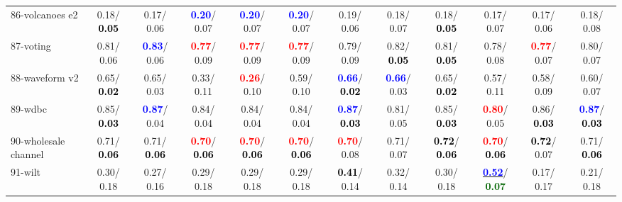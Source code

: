 \begin{table}[h]
\begin{center}
{\begin{tabular}{lc|c|c|c|c|c|c|c|c|c|c}
86-volcanoes e2 &   0.18/\textcolor{black}{\textbf{  0.05}} &   0.17/  0.06 & \textcolor{blue}{\textbf{  0.20}}/  0.07 & \textcolor{blue}{\textbf{  0.20}}/  0.07 & \textcolor{blue}{\textbf{  0.20}}/  0.07 &   0.19/  0.06 &   0.18/  0.07 &   0.18/\textcolor{black}{\textbf{  0.05}} &   0.17/  0.07 &   0.17/  0.06 &   0.18/  0.08 \\
87-voting &   0.81/  0.06 & \textcolor{blue}{\textbf{  0.83}}/  0.06 & \textcolor{red}{\textbf{  0.77}}/  0.09 & \textcolor{red}{\textbf{  0.77}}/  0.09 & \textcolor{red}{\textbf{  0.77}}/  0.09 &   0.79/  0.09 &   0.82/\textcolor{black}{\textbf{  0.05}} &   0.81/\textcolor{black}{\textbf{  0.05}} &   0.78/  0.08 & \textcolor{red}{\textbf{  0.77}}/  0.07 &   0.80/  0.07 \\
88-waveform v2 &   0.65/\textcolor{black}{\textbf{  0.02}} &   0.65/  0.03 &   0.33/  0.11 & \textcolor{red}{\textbf{  0.26}}/  0.10 &   0.59/  0.10 & \textcolor{blue}{\textbf{  0.66}}/\textcolor{black}{\textbf{  0.02}} & \textcolor{blue}{\textbf{  0.66}}/  0.03 &   0.65/\textcolor{black}{\textbf{  0.02}} &   0.57/  0.11 &   0.58/  0.09 &   0.60/  0.07 \\
89-wdbc &   0.85/\textcolor{black}{\textbf{  0.03}} & \textcolor{blue}{\textbf{  0.87}}/  0.04 &   0.84/  0.04 &   0.84/  0.04 &   0.84/  0.04 & \textcolor{blue}{\textbf{  0.87}}/\textcolor{black}{\textbf{  0.03}} &   0.81/  0.05 &   0.85/\textcolor{black}{\textbf{  0.03}} & \textcolor{red}{\textbf{  0.80}}/  0.05 &   0.86/\textcolor{black}{\textbf{  0.03}} & \textcolor{blue}{\textbf{  0.87}}/\textcolor{black}{\textbf{  0.03}} \\
90-wholesale channel &   0.71/\textcolor{black}{\textbf{  0.06}} &   0.71/\textcolor{black}{\textbf{  0.06}} & \textcolor{red}{\textbf{  0.70}}/\textcolor{black}{\textbf{  0.06}} & \textcolor{red}{\textbf{  0.70}}/\textcolor{black}{\textbf{  0.06}} & \textcolor{red}{\textbf{  0.70}}/\textcolor{black}{\textbf{  0.06}} & \textcolor{red}{\textbf{  0.70}}/  0.08 &   0.71/  0.07 & \textcolor{black}{\textbf{  0.72}}/\textcolor{black}{\textbf{  0.06}} & \textcolor{red}{\textbf{  0.70}}/\textcolor{black}{\textbf{  0.06}} & \textcolor{black}{\textbf{  0.72}}/  0.07 &   0.71/\textcolor{black}{\textbf{  0.06}} \\
91-wilt &   0.30/  0.18 &   0.27/  0.16 &   0.29/  0.18 &   0.29/  0.18 &   0.29/  0.18 & \textcolor{black}{\textbf{  0.41}}/  0.14 &   0.32/  0.14 &   0.30/  0.18 & \underline{\textcolor{blue}{\textbf{  0.52}}}/\textcolor{darkgreen}{\textbf{  0.07}} &   0.17/  0.17 &   0.21/  0.18 \\

\end{tabular}}
\end{center}
\end{table}
